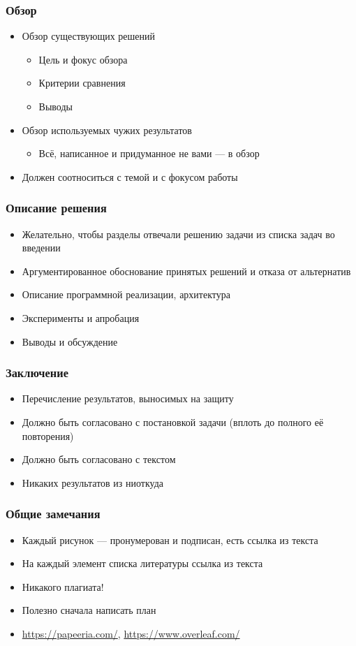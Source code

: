 \documentclass[xetex,mathserif,serif]{beamer}
\begin{document}
	\begin{frame}
	\frametitle{Обзор}
	\begin{itemize}
		\item Обзор существующих решений
		      \begin{itemize}
			      \item Цель и фокус обзора
			      \item Критерии сравнения
			      \item Выводы
		      \end{itemize}
		\item Обзор используемых чужих результатов
		      \begin{itemize}
			      \item  Всё, написанное и придуманное не вами --- в обзор
		      \end{itemize}
		\item Должен соотноситься с темой и с фокусом работы
	\end{itemize}
	\end{frame}

	\begin{frame}
	\frametitle{Описание решения}
	\begin{itemize}
		\item Желательно, чтобы разделы отвечали решению задачи из списка задач во введении
		\item Аргументированное обоснование принятых решений и отказа от альтернатив
		\item Описание программной реализации, архитектура
		\item Эксперименты и апробация
		\item Выводы и обсуждение
	\end{itemize}
	\end{frame}

	\begin{frame}
	\frametitle{Заключение}
	\begin{itemize}
		\item Перечисление результатов, выносимых на защиту
		\item Должно быть согласовано с постановкой задачи (вплоть до полного её повторения)
		\item Должно быть согласовано с текстом
		\item Никаких результатов из ниоткуда
	\end{itemize}
	\end{frame}

	\begin{frame}
	\frametitle{Общие замечания}
	\begin{itemize}
		\item Каждый рисунок --- пронумерован и подписан, есть ссылка из текста
		\item На каждый элемент списка литературы ссылка из текста
		\item Никакого плагиата!
		\item Полезно сначала написать план
		\item \url{https://papeeria.com/}, \url{https://www.overleaf.com/}
	\end{itemize}
	\end{frame}
\end{document}
